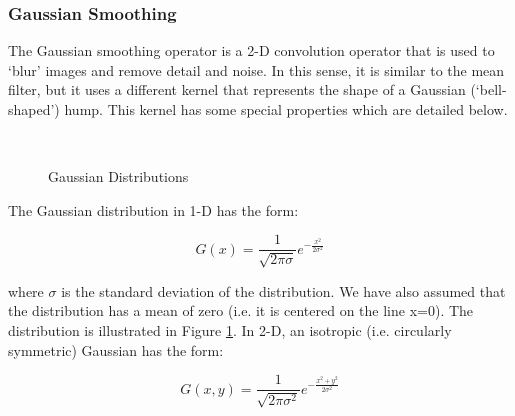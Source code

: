 \subsubsection{Gaussian Smoothing}
The Gaussian smoothing operator is a 2-D convolution operator that is used to `blur' images and remove detail and noise. In this sense, it is similar to the mean filter, but it uses a different kernel that represents the shape of a Gaussian (`bell-shaped') hump. This kernel has some special properties which are detailed below.
\begin{figure}[]
\begin{dBox}
\centering
  \mbox{
   }
   \caption{Gaussian Distributions \label{fig:gaussian_dist} }   
\end{dBox}   
\end{figure}
\bigskip
The Gaussian distribution in 1-D has the form:
\begin{dBox}
\begin{equation}
	G(x) = \frac{1}{\sqrt{2\pi\sigma}}e^{-\frac{x^2}{2\sigma^2}}
\end{equation}
\end{dBox}
where $\sigma$  is the standard deviation of the distribution. We have also assumed that the distribution has a mean of zero (i.e. it is centered on the line x=0). The distribution is illustrated in Figure \ref{fig:gaussian_dist}.
\bigskip
In 2-D, an isotropic (i.e. circularly symmetric) Gaussian has the form:
\begin{dBox}
\begin{equation}
	G(x,y) = \frac{1}{\sqrt{2\pi\sigma^2}}e^{-\frac{x^2+y^2}{2\sigma^2}}
\end{equation}
\end{dBox}
